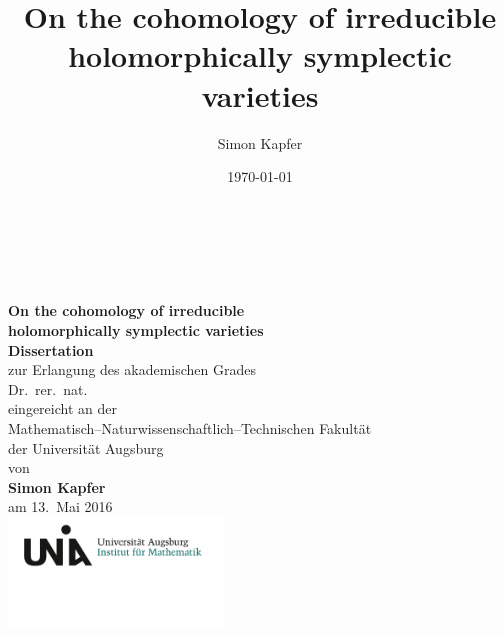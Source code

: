 \documentclass[11pt,twoside]{article}
\begin{document}
\title{
\bf On the cohomology of irreducible holomorphically symplectic varieties
}


\author{Simon Kapfer}


\date{\today}
\thispagestyle{empty}
\begin{center}
\ \\
\ \\
\ \\
\textbf{ \LARGE On the cohomology of irreducible\\holomorphically symplectic varieties}
\\
\vspace{12mm}
\Large \textbf{Dissertation} \\
\textnormal\large zur Erlangung des akademischen Grades \\
\vspace{1mm}
Dr.~rer.~nat. \\
\vspace{8mm}
eingereicht an der \\
Mathematisch--Naturwissenschaftlich--Technischen Fakult\"at\\
der Universit\"at Augsburg
\\ \vspace{6mm}
von \\
\textbf{Simon Kapfer}\\
\vspace{8mm}
am 13.~Mai 2016 \\
\vspace{15mm}
\includegraphics[height=30mm]{LogoInstitut.png}
\end{center}
\clearpage
\end{document}
